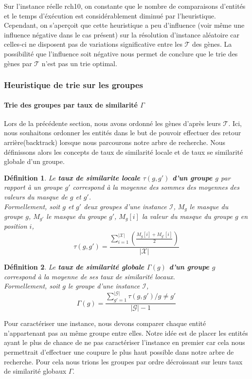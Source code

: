 \documentclass[a4paper,10pt]{article}
\newtheorem{definition}{Définition}
\begin{document}
Sur l'instance réelle rch10, on constante que le nombre de comparaisons d'entités  et le temps d'éxécution est considérablement diminué par l'heuristique. Cependant, on s'aperçoit que cette heuristique a peu d'influence (voir même une influence négative dans le cas présent) sur la résolution d'instance aléatoire car celles-ci ne disposent pas de variations significative entre les $\mathcal{T}$ des gènes. La possibilité que l'influence soit négative nous permet de conclure que le trie des gènes par $\mathcal{T}$ n'est pas un trie optimal. 


\subsubsection{Heuristique de trie sur les groupes}
\paragraph{Trie des groupes par taux de similarité $\Gamma$}
Lors de la précédente section, nous avons ordonné les gènes d'après leurs $\mathcal{T}$. Ici, nous souhaitons ordonner les entités dans le but de pouvoir effectuer des retour arrière(backtrack) lorsque nous parcourons notre arbre de recherche. Nous définissons alors les concepts de taux de similarité locale et de taux se similarité globale d'un groupe.

\begin{definition}
Le \textbf{taux de similarite locale $\tau(g,g')$ d'un groupe $g$} par rapport à un groupe $g'$ correspond à la moyenne des sommes des moyennes des valeurs du masque de $g$ et $g'$.\\
Formellement, soit $g$ et $g'$ deux groupes d'une instance $\mathcal{I}$, $M_g$ le masque du groupe $g$, $M_{g'}$ le masque du groupe $g'$, $M_g[i]$ la valeur du masque du groupe $g$ en position $i$,
$$ \tau(g,g')= \frac{\sum_{i=1}^{|\mathcal{X}|}(\frac{M_g[i]+M_{g'}[i]}{2})}{|\mathcal{X}|}$$
\end{definition}

\begin{definition}
Le \textbf{taux de similarité globale $\Gamma(g)$ d'un groupe $g$} correspond à la moyenne de ses taux de similarité locaux.\\
Formellement, soit $g$ le groupe d'une instance $\mathcal{I}$,
$$ \Gamma(g)=\frac{\sum_{g'=1}^{|\mathcal{G}|}\tau(g,g') /g \neq g'}{|\mathcal{G}|-1} $$
\end{definition}

Pour caractériser une instance, nous devons comparer chaque entité n'appartenant pas au même groupe entre elles. Notre idée est de placer les entités ayant le plus de chance de ne pas caractériser l'instance en premier car cela nous permettrait d'effectuer une coupure le plus haut possible dans notre arbre de recherche. Pour cela nous trions les groupes par ordre décroissant sur leurs taux de similarité globaux $\Gamma$.
\end{document}
